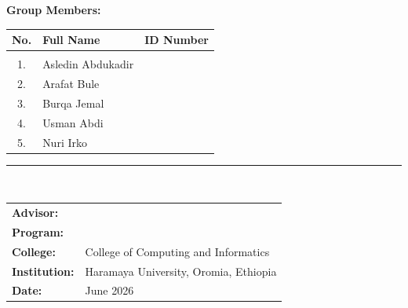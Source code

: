 \documentclass[12pt, a4paper]{article}
\begin{document}
\begin{titlepage}
\begin{center}
\begin{tcolorbox}[
    enhanced, colback=lightblue, colframe=uniblue,
    arc=4pt, boxrule=1pt, width=0.82\textwidth,
    top=6pt, bottom=6pt, left=10pt, right=10pt
]
\begin{flushleft}
{\bfseries\normalsize\textcolor{uniblue}{Group Members:}}\\[0.2cm]
\begin{tabular}{cll}
\textbf{\textcolor{uniblue}{No.}} & \textbf{\textcolor{uniblue}{Full Name}} & \textbf{\textcolor{uniblue}{ID Number}} \\[3pt]
\hline\\[-7pt]
1. & Asledin Abdukadir &  \\[2pt]
2. & Arafat Bule       &  \\[2pt]
3. & Burqa Jemal       &  \\[2pt]
4. & Usman Abdi        &  \\[2pt]
5. & Nuri Irko         &  \\[2pt]
\end{tabular}
\vspace{0.2cm}
\textcolor{uniblue}{\rule{0.70\textwidth}{0.5pt}}\\[0.15cm]
\begin{tabular}{ll}
\textbf{\textcolor{uniblue}{Advisor:}}     &  \\[2pt]
\textbf{\textcolor{uniblue}{Program:}}     &  \\[2pt]
\textbf{\textcolor{uniblue}{College:}}     & College of Computing and Informatics \\[2pt]
\textbf{\textcolor{uniblue}{Institution:}} & Haramaya University, Oromia, Ethiopia \\[2pt]
\textbf{\textcolor{uniblue}{Date:}}        & June 2026 \\[2pt]
\end{tabular}
\end{flushleft}
\end{tcolorbox}
\end{center}
\end{titlepage}
\end{document}
